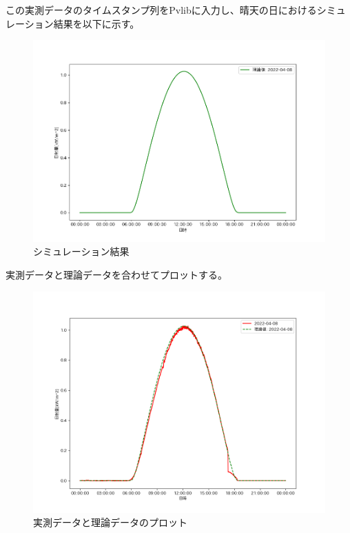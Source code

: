 \documentclass[a4j,12pt,]{jarticle}
\begin{document}
この実測データのタイムスタンプ列をPvlibに入力し、晴天の日におけるシミュレーション結果を以下に示す。

\begin{figure}[H]
  \begin{center}
    \includegraphics[width=160mm]{3.png}
    \caption{シミュレーション結果}
    \label{p3}
  \end{center}
\end{figure}

実測データと理論データを合わせてプロットする。

\begin{figure}[H]
  \begin{center}
    \includegraphics[width=160mm]{4.png}
    \caption{実測データと理論データのプロット}
    \label{p4}
  \end{center}
\end{figure}
\end{document}
